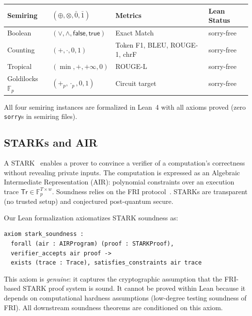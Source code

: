 \documentclass[11pt]{article}
\newcommand{\F}{\mathbb{F}}
\newcommand{\Tr}{\textsf{Tr}}
\newcommand{\sorry}{\texttt{sorry}}
\begin{document}
\begin{center}\small
\begin{tabular}{@{}llll@{}}
\toprule
\textbf{Semiring} & $(\oplus, \otimes, \bar{0}, \bar{1})$ & \textbf{Metrics} & \textbf{Lean Status} \\
\midrule
Boolean  & $(\lor, \land, \mathsf{false}, \mathsf{true})$ & Exact Match & sorry-free \\
Counting & $(+, \cdot, 0, 1)$ & Token F1, BLEU, ROUGE-1, chrF & sorry-free \\
Tropical & $(\min, +, +\infty, 0)$ & ROUGE-L & sorry-free \\
Goldilocks $\F_p$ & $(+_p, \cdot_p, 0, 1)$ & Circuit target & sorry-free \\
\bottomrule
\end{tabular}
\end{center}

All four semiring instances are formalized in Lean~4 with
all axioms proved (zero \sorry{}s in semiring files).

\subsection{STARKs and AIR}

A STARK~\cite{bensasson2018stark} enables a prover to convince a verifier
of a computation's correctness without revealing private inputs.
The computation is expressed as an Algebraic Intermediate Representation
(AIR): polynomial constraints over an execution trace
$\Tr \in \F_p^{T \times w}$.
Soundness relies on the FRI protocol~\cite{bensasson2018fri}.
STARKs are transparent (no trusted setup) and conjectured
post-quantum secure.

Our Lean formalization axiomatizes STARK soundness as:

\begin{lstlisting}[language=Lean4,caption={STARK soundness axiom (not provable in Lean).}]
axiom stark_soundness :
  forall (air : AIRProgram) (proof : STARKProof),
  verifier_accepts air proof ->
  exists (trace : Trace), satisfies_constraints air trace
\end{lstlisting}

This axiom is \emph{genuine}: it captures the cryptographic assumption
that the FRI-based STARK proof system is sound.
It cannot be proved within Lean because it depends on computational
hardness assumptions (low-degree testing soundness of FRI).
All downstream soundness theorems are conditioned on this axiom.
\end{document}
